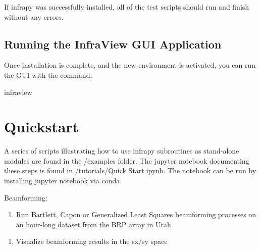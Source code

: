 \documentclass[letterpaper,10pt,english]{sphinxmanual}
\begin{document}
If infrapy was successfully installed, all of the test scripts should run and finish without any errors.


\subsection{Running the InfraView GUI Application}
\label{\detokenize{installation:running-the-infraview-gui-application}}
Once installation is complete, and the new environment is activated, you can run the GUI with the command:

\begin{sphinxVerbatim}[commandchars=\\\{\}]
\PYGZgt{}\PYGZgt{} infraview
\end{sphinxVerbatim}


\section{Quickstart}
\label{\detokenize{quickstart:quickstart}}\label{\detokenize{quickstart:id1}}\label{\detokenize{quickstart::doc}}
A series of scripts illustrating how to use infrapy subroutines as stand-alone modules are found in the /examples folder.
The jupyter notebook documenting these steps is found in /tutorials/Quick Start.ipynb.  The notebook can be run by installing jupyter notebook via conda.

\begin{sphinxVerbatim}[commandchars=\\\{\}]
    
\end{sphinxVerbatim}

Beamforming:
\begin{enumerate}
\def\theenumi{\arabic{enumi}}
\def\labelenumi{\theenumi .}
\makeatletter\def\p@enumii{\p@enumi \theenumi .}\makeatother
\item {} 
Run Bartlett, Capon or Generalized Least Squares beamforming processes on an hour-long dataset from the BRP array in Utah

\end{enumerate}

\begin{sphinxVerbatim}[commandchars=\\\{\}]
  
\end{sphinxVerbatim}
\begin{enumerate}
\def\theenumi{\arabic{enumi}}
\def\labelenumi{\theenumi .}
\makeatletter\def\p@enumii{\p@enumi \theenumi .}\makeatother
\setcounter{enumi}{1}
\item {} 
Visualize beamforming results in the sx/sy space

\end{enumerate}
\end{document}
